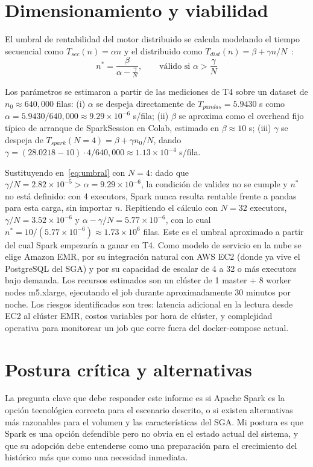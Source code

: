 \documentclass[11pt,a4paper]{article}
\begin{document}
\section{Dimensionamiento y viabilidad}
El umbral de rentabilidad del motor distribuido se calcula modelando el tiempo secuencial como $T_{sec}(n) = \alpha n$ y el distribuido como $T_{dist}(n) = \beta + \gamma n/N$~\cite{cierco2011}:
\begin{equation}
n^{*} = \frac{\beta}{\alpha - \frac{\gamma}{N}}, \qquad \text{válido si } \alpha > \frac{\gamma}{N}
\label{eq:umbral}
\end{equation}

Los parámetros se estimaron a partir de las mediciones de T4 sobre un dataset de $n_0 \approx 640{,}000$ filas: (i) $\alpha$ se despeja directamente de $T_{pandas} = 5.9430$ s como $\alpha = 5.9430 / 640{,}000 \approx 9.29 \times 10^{-6}$ s/fila; (ii) $\beta$ se aproxima como el overhead fijo típico de arranque de SparkSession en Colab, estimado en $\beta \approx 10$ s; (iii) $\gamma$ se despeja de $T_{spark}(N{=}4) = \beta + \gamma n_0 / N$, dando $\gamma = (28.0218 - 10) \cdot 4 / 640{,}000 \approx 1.13 \times 10^{-4}$ s/fila.

Sustituyendo en~\eqref{eq:umbral} con $N=4$: dado que $\gamma/N = 2.82\times 10^{-5} > \alpha = 9.29 \times 10^{-6}$, la condición de validez no se cumple y $n^{*}$ no está definido: con 4 executors, Spark nunca resulta rentable frente a pandas para esta carga, sin importar $n$. Repitiendo el cálculo con $N=32$ executors, $\gamma/N = 3.52\times 10^{-6}$ y $\alpha - \gamma/N = 5.77\times 10^{-6}$, con lo cual $n^{*} = 10 / (5.77 \times 10^{-6}) \approx 1.73 \times 10^{6}$ filas. Este es el umbral aproximado a partir del cual Spark empezaría a ganar en T4. Como modelo de servicio en la nube se elige Amazon EMR, por su integración natural con AWS EC2 (donde ya vive el PostgreSQL del SGA) y por su capacidad de escalar de 4 a 32 o más executors bajo demanda. Los recursos estimados son un clúster de 1 master + 8 worker nodes m5.xlarge, ejecutando el job durante aproximadamente 30 minutos por noche. Los riesgos identificados son tres: latencia adicional en la lectura desde EC2 al clúster EMR, costos variables por hora de clúster, y complejidad operativa para monitorear un job que corre fuera del docker-compose actual.

\section{Postura crítica y alternativas}
La pregunta clave que debe responder este informe es si Apache Spark es la opción tecnológica correcta para el escenario descrito, o si existen alternativas más razonables para el volumen y las características del SGA. Mi postura es que Spark es una opción defendible pero no obvia en el estado actual del sistema, y que su adopción debe entenderse como una preparación para el crecimiento del histórico más que como una necesidad inmediata.
\end{document}
